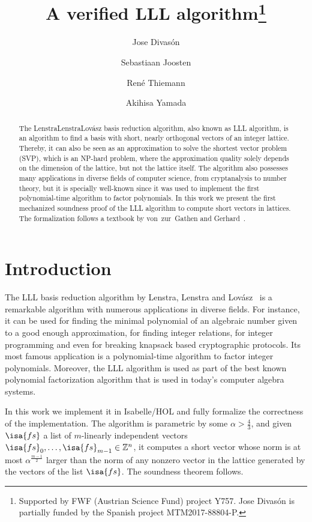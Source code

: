 \documentclass[11pt,a4paper]{article}
\newcommand\ints{\mathbb{Z}}
\newcommand\Base[2][m]{{#2}_0,\ldots,{#2}_{#1-1}}
\begin{document}
\title{A verified LLL algorithm\footnote{Supported by FWF (Austrian Science Fund) project Y757.
Jose Divas\'on is partially funded by the
Spanish project MTM2017-88804-P.}}
\author{Jose Divas\'on \and
  Sebastiaan Joosten \and
  Ren\'e Thiemann \and
  Akihisa Yamada}
\maketitle


\begin{abstract}
The Lenstra\textendash{}Lenstra\textendash{}Lov\'asz basis reduction algorithm, 
also known as LLL algorithm, is an algorithm 
to find a basis with short, nearly orthogonal vectors of an integer lattice. 
Thereby, it can also be seen as an approximation to solve the shortest vector problem (SVP), 
which is an NP-hard problem, where the approximation
quality solely depends on the dimension of the lattice, but not the lattice itself. 
The algorithm also possesses many applications in diverse fields of computer science, 
from cryptanalysis to number theory, but it is specially well-known 
since it was used to implement the first polynomial-time algorithm to factor polynomials.
In this work we present the first mechanized soundness proof of the LLL algorithm to compute 
short vectors in lattices. The formalization follows a textbook by von~zur~Gathen and Gerhard~\cite{MCA}.
\end{abstract}

\tableofcontents

\section{Introduction}

The LLL basis reduction algorithm by Lenstra, Lenstra and Lov\'asz~\cite{LLL} is a remarkable algorithm with 
numerous applications in diverse fields. For instance, it can be used for 
finding the minimal polynomial of an algebraic number given to a good enough approximation, for finding integer
relations, for integer programming and even for breaking knapsack based cryptographic protocols.
Its most famous application is a polynomial-time algorithm to factor integer polynomials.
Moreover, the LLL algorithm is used as part of the best known polynomial factorization algorithm 
that is used in today's computer algebra systems.

In this work we implement it in Isabelle/HOL and fully formalize the correctness of the implementation.
The algorithm is parametric by some $\alpha > \frac43$, and given $\isa{fs}$ a list of 
$m$-linearly independent vectors $\Base {\isa{fs}} \in \ints^n$, it computes a short vector whose norm is at most $\alpha^{\frac{m-1}2}$ larger 
than the norm of any nonzero vector in the lattice generated by the vectors of the list $\isa{fs}$.
The soundness theorem follows.
\end{document}
